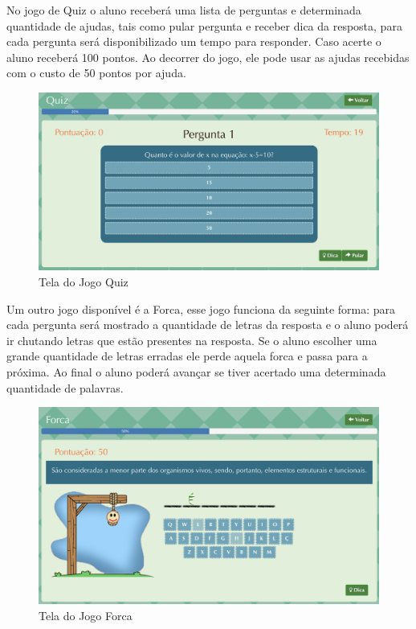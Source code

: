 No jogo de Quiz o aluno receberá uma lista de perguntas e determinada quantidade de ajudas, tais como pular pergunta e receber dica da resposta, para cada pergunta será disponibilizado um tempo para responder. Caso acerte o aluno receberá 100 pontos. Ao decorrer do jogo, ele pode usar as ajudas recebidas com o custo de 50 pontos por ajuda.

\begin{figure}[H]
  \centering
  \includegraphics[scale=0.25]{images/proposta-img/Figura4-22.png}
  \caption{Tela do Jogo Quiz}
  \label{fig:Figura4-22}
\end{figure}

Um outro jogo disponível é a Forca, esse jogo funciona da seguinte forma: para cada pergunta será mostrado a quantidade de letras da resposta e o aluno poderá ir chutando letras que estão presentes na resposta. Se o aluno escolher uma grande quantidade de letras erradas ele perde aquela forca e passa para a próxima. Ao final o aluno poderá avançar se tiver acertado uma determinada quantidade de palavras.

\begin{figure}[H]
  \centering
  \includegraphics[scale=0.25]{images/proposta-img/Figura4-23.png}
  \caption{Tela do Jogo Forca}
  \label{fig:Figura4-23}
\end{figure}


